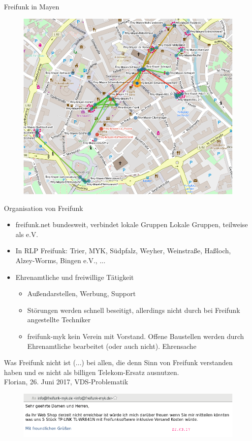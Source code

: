 \documentclass{beamer}
\begin{document}
\begin{frame}{Freifunk in Mayen}

\begin{figure}
	\centering
	\includegraphics[width=0.7\linewidth]{Bilder/Mayen}
	\label{fig:mayen}
\end{figure}

\end{frame}

\begin{frame} {Organisation von Freifunk}
\begin{itemize}
\item freifunk.net bundesweit, verbindet lokale Gruppen
Lokale Gruppen, teilweise als e.V.
\item In RLP Freifunk: Trier, MYK, Südpfalz, Weyher, Weinstraße, Haßloch, Alzey-Worms, Bingen e.V., ...
\item Ehrenamtliche und freiwillige Tätigkeit
\begin{itemize}
\item Außendarstellen, Werbung, Support
\item Störungen werden schnell beseitigt, allerdings nicht durch bei Freifunk angestellte Techniker
\item freifunk-myk kein Verein mit Vorstand. Offene Baustellen werden durch Ehrenamtliche bearbeitet (oder auch nicht). Ehrensache
\end{itemize}
\end{itemize}
\end{frame}

\begin{frame}{Was Freifunk nicht ist}
\glqq (...) bei allen, die denn Sinn von Freifunk verstanden haben und es nicht als billigen Telekom-Ersatz ausnutzen.\grqq \\
Florian, 26. Juni 2017, VDS-Problematik
\begin{figure}
\centering
\includegraphics[width=1.0\linewidth]{Bilder/Webshopmail}
\label{fig:webshopmail}
\end{figure}
\end{frame}
\end{document}
